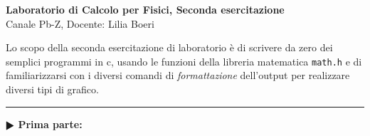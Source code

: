 \documentclass[11pt]{article}
\begin{document}
\pagestyle{empty}

\begin{center}
{\Large \bf  Laboratorio di Calcolo per Fisici, Seconda esercitazione\\[2mm]}
{\large Canale Pb-Z, Docente: Lilia Boeri}
\end{center}
\vspace{1mm}

\begin{mdframed}[backgroundcolor=panna]
  Lo scopo della seconda esercitazione di laboratorio \`e di
  scrivere da zero dei semplici programmi in c, usando le funzioni
  della libreria matematica \texttt{math.h} e di familiarizzarsi con i diversi
  comandi di {\em formattazione} dell'output per realizzare diversi
  tipi di grafico.
  \end{mdframed}
%
%
\hrule
\vspace{1mm}
\textbf{$\RHD$ Prima parte:} 
\end{document}

